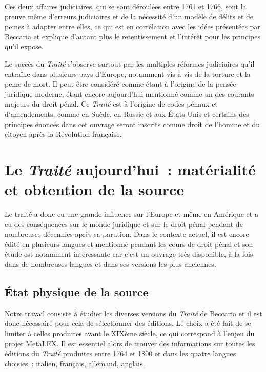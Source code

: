 Ces deux affaires judiciaires, qui se sont déroulées entre 1761 et 1766, sont la preuve même d'erreurs judiciaires et de la nécessité d'un modèle de délits et de peines à adapter entre elles, ce qui est en corrélation avec les idées présentées par Beccaria et explique d'autant plus le retentissement et l'intérêt pour les principes qu'il expose.

Le succès du \emph{Traité} s'observe surtout par les multiples réformes judiciaires qu'il entraîne dans plusieurs pays d'Europe, notamment vis-à-vis de la torture et la peine de mort. Il peut être considéré comme étant à l'origine de la pensée juridique moderne, étant encore aujourd'hui mentionné comme un des courants majeurs du droit pénal. Ce \emph{Traité} est à l'origine de codes pénaux et d'amendements, comme en Suède, en Russie et aux États-Unis et certains des principes énoncés dans cet ouvrage seront inscrits comme droit de l'homme et du citoyen après la Révolution française.

\section{Le \emph{Traité} aujourd'hui~: matérialité et obtention de la source}
Le traité a donc eu une grande influence sur l'Europe et même en Amérique et a eu des conséquences sur le monde juridique et sur le droit pénal pendant de nombreuses décennies après sa parution. Dans le contexte actuel, il est encore édité en plusieurs langues et mentionné pendant les cours de droit pénal et son étude est notamment intéressante car c'est un ouvrage très disponible, à la fois dans de nombreuses langues et dans ses versions les plus anciennes.

\subsection{État physique de la source}
Notre travail consiste à étudier les diverses versions du \emph{Traité} de Beccaria et il est donc nécessaire pour cela de sélectionner des éditions. Le choix a été fait de se limiter à celles produites avant le XIXème siècle, ce qui correspond à l'enjeu du projet MetaLEX. Il est essentiel alors de trouver des informations sur toutes les éditions du \emph{Traité} produites entre 1764 et 1800 et dans les quatre langues choisies~: italien, français, allemand, anglais.

